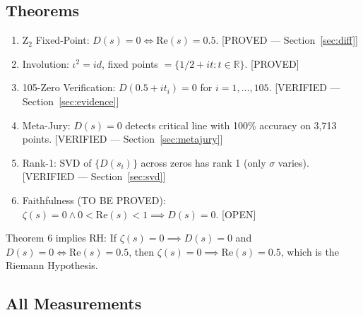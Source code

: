 \documentclass[11pt]{article}
\begin{document}
\subsection{Theorems}

\begin{enumerate}
\item Z$_2$ Fixed-Point: $D(s) = 0 \iff \mathrm{Re}(s) = 0.5$. [PROVED --- Section~\ref{sec:diff}]
\item Involution: $\iota^2 = id$, fixed points $= \{1/2 + it : t \in \mathbb{R}\}$. [PROVED]
\item 105-Zero Verification: $D(0.5 + it_i) = 0$ for $i = 1,\ldots,105$. [VERIFIED --- Section~\ref{sec:evidence}]
\item Meta-Jury: $D(s) = 0$ detects critical line with 100\% accuracy on 3,713 points. [VERIFIED --- Section~\ref{sec:metajury}]
\item Rank-1: SVD of $\{D(s_i)\}$ across zeros has rank 1 (only $\sigma$ varies). [VERIFIED --- Section~\ref{sec:svd}]
\item Faithfulness (TO BE PROVED): $\zeta(s) = 0 \land 0 < \mathrm{Re}(s) < 1 \implies D(s) = 0$. [OPEN]
\end{enumerate}

Theorem 6 implies RH: If $\zeta(s)=0 \implies D(s)=0$ and $D(s)=0 \iff \mathrm{Re}(s)=0.5$, then $\zeta(s)=0 \implies \mathrm{Re}(s)=0.5$, which is the Riemann Hypothesis.

\subsection{All Measurements}
\end{document}
